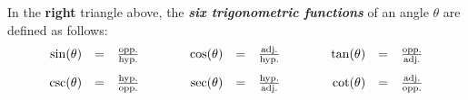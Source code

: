 In the \textbf{right} triangle above, the \textbf{\emph{six
    trigonometric functions}} of an angle $\theta$ are defined as
follows:
\begin{eqnarray*}
  \begin{array}{rcl@{\hspace{4em}}rcl@{\hspace{4em}}rcl}
    \sin(\theta) & = & \frac{\textrm{opp.}}{\textrm{hyp.}} & 
    \cos(\theta) & = & \frac{\textrm{adj.}}{\textrm{hyp.}} &
    \tan(\theta) & = & \frac{\textrm{opp.}}{\textrm{adj.}} \\ [10pt]
    \csc(\theta) & = & \frac{\textrm{hyp.}}{\textrm{opp.}} & 
    \sec(\theta) & = & \frac{\textrm{hyp.}}{\textrm{adj.}} &
    \cot(\theta) & = & \frac{\textrm{adj.}}{\textrm{opp.}} 
  \end{array}
\end{eqnarray*}



\newpage





